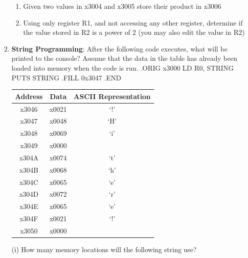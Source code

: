 \documentclass{article}
\begin{document}
\begin{enumerate}[label=(\alph*)]
\begin{enumerate}[label=(\roman*),itemsep = 10pt]
            \item Given two values in x3004 and x3005 store their product in x3006
            \item Using only register R1, and not accessing any other register, determine if the value stored in R2 is a power of 2 (you may also edit the value in R2)
        \end{enumerate}
        \item \textbf{String Programming}: After the following code executes, what will be printed to the console? Assume that the data in the table has already been loaded into memory when the code is run.
        \newline
        \newline
        .ORIG x3000
        \newline
        LD R0, STRING
        \newline
        PUTS
        \newline
        STRING
        \newline
        	.FILL 0x3047
        \newline
        .END
        \newline
        \begin{table}[h]
        \centering
        \begin{tabular}{|c|c|c|}
        \hline
        \textbf{Address} & \textbf{Data} & \textbf{ASCII Representation} \\\hline
        x3046 & x0021 & ‘!’ \\\hline
        x3047 & x0048 & ‘H’ \\\hline
        x3048 & x0069 & ‘i’ \\\hline
        x3049 & x0000 &     \\\hline
        x304A & x0074 & ‘t’ \\\hline
        x304B & x0068 & ‘h’ \\\hline
        x304C & x0065 & ‘e’ \\\hline
        x304D & x0072 & ‘r’ \\\hline
        x304E & x0065 & ‘e’ \\\hline
        x304F & x0021 & ‘!’ \\\hline
        x3050 & x0000 &     \\
        \hline
        \end{tabular}
        \end{table}
        \newline
        (i) How many memory locations will the following string use?

\end{enumerate}
\end{document}
